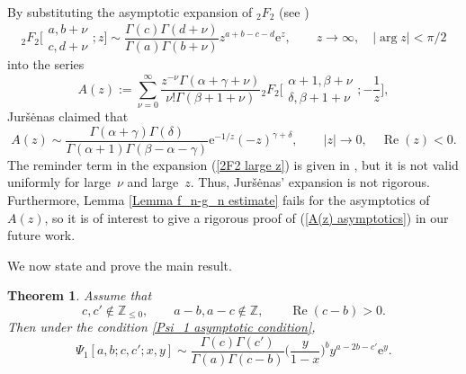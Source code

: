 \documentclass[10pt,a4paper]{amsart}
\numberwithin{equation}{section}
\newtheorem{Theorem}{Theorem}[section]
\newcommand{\ZZ}{\ensuremath{\mathbb{Z}}}
\newcommand{\me}{\mathrm{e}}
\begin{document}
\begin{Remark}
	By substituting the asymptotic expansion of $_2F_2$ (see \cite[p.~380]{Paris-2005})
	\begin{equation}\label{2F2 large z}
		{}_2F_2\biggl[\begin{matrix}
			a,b+\nu\\
			c,d+\nu
		\end{matrix};z\biggr]\sim \frac{\Gamma(c)\Gamma(d+\nu)}{\Gamma(a)\Gamma(b+\nu)}z^{a+b-c-d}\me^z,\qquad z\to \infty,\quad|\arg z|<\pi/2
	\end{equation}
	into the series
	\[A(z):=\sum_{\nu=0}^{\infty}\frac{z^{-\nu}\Gamma(\alpha+\gamma+\nu)}{\nu!\Gamma(\beta+1+\nu)}{}_2F_2\biggl[\begin{matrix}
		\alpha+1,\beta+\nu\\
		\delta,\beta+1+\nu
	\end{matrix};-\frac{1}{z}\biggr],\]
	Jur\v{s}\.enas \cite[Section~4.2]{Jursenas-2014} claimed that
	\begin{equation}\label{A(z) asymptotics}
		A(z)\sim \frac{\Gamma(\alpha+\gamma)\Gamma(\delta)}{\Gamma(\alpha+1)\Gamma(\beta-\alpha-\gamma)}\mathrm{e}^{-1/z}(-z)^{\gamma+\delta},\qquad |z|\to 0,\quad\operatorname{Re}(z)<0.
	\end{equation}
	The reminder term in the expansion (\ref{2F2 large z}) is given in \cite{Lin_Wong-2018}, but it is not valid uniformly for large~$\nu$ and large~$z$. Thus, Jur\v{s}\.enas' expansion is not rigorous. Furthermore, Lemma \ref{Lemma f_n-g_n estimate} fails for the asymptotics of $A(z)$, so it is of interest to give a rigorous proof of (\ref{A(z) asymptotics}) in our future work.
\end{Remark}

We now state and prove the main result.


\begin{Theorem}\label{Thm: Psi_1 two large arguments}
	Assume that
	\[c,c'\notin\ZZ_{\leqslant 0},\qquad a-b,a-c\notin\ZZ,\qquad \operatorname{Re}(c-b)>0.\]
	Then under the condition \eqref{Psi_1 asymptotic condition},
	\begin{equation}\label{Thm: Psi_1 two large arguments 1}
		\Psi_1[a,b;c,c';x,y]\sim \frac{\Gamma(c)\Gamma(c')}{\Gamma(a)\Gamma(c-b)}\biggl(\frac{y}{1-x}\biggr)^b y^{a-2b-c'}\me^y.
	\end{equation}
\end{Theorem}
\end{document}
